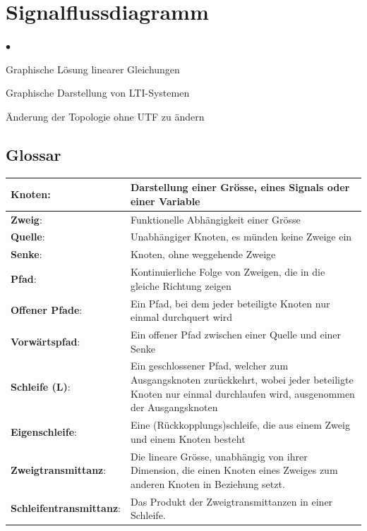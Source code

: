 \section{Signalflussdiagramm }
\begin{list}{$\bullet$}{\setlength{\itemsep}{0cm} \setlength{\parsep}{0cm} \setlength{\topsep}{0cm}} 
  \item Graphische Lösung linearer Gleichungen
  \item Graphische Darstellung von LTI-Systemen
  \item Änderung der Topologie ohne UTF zu ändern
\end{list}

\subsection{Glossar }
  \begin{tabular}{|m{4cm} | m{14cm}|}
    \hline
      \textbf{Knoten}: &
      Darstellung einer Grösse, eines Signals oder einer Variable \\
    \hline
      \textbf{Zweig}: &
      Funktionelle Abhängigkeit einer Grösse \\
    \hline
      \textbf{Quelle}: &
      Unabhängiger Knoten, es münden keine Zweige ein \\
    \hline
      \textbf{Senke}: &
      Knoten, ohne weggehende Zweige \\
    \hline
      \textbf{Pfad}: &
      Kontinuierliche Folge von Zweigen, die in die gleiche Richtung zeigen \\
    \hline
      \textbf{Offener Pfade}: &
      Ein Pfad, bei dem jeder beteiligte Knoten nur einmal durchquert wird \\
      \textbf{Vorwärtspfad}: &
      Ein offener Pfad zwischen einer Quelle und einer Senke \\
    \hline
      \textbf{Schleife (L)}: &
      Ein geschlossener Pfad, welcher zum Ausgangsknoten zurückkehrt, 
      wobei jeder beteiligte Knoten nur einmal durchlaufen wird, ausgenommen der
      Ausgangsknoten \\
    \hline
      \textbf{Eigenschleife}: &
      Eine (Rückkopplungs)schleife, die aus einem Zweig und einem Knoten besteht \\
    \hline
      \textbf{Zweigtransmittanz}: &
      Die lineare Grösse, unabhängig von ihrer Dimension, 
      die einen Knoten eines Zweiges zum anderen Knoten in Beziehung setzt. \\
    \hline
      \textbf{Schleifentransmittanz}: &
      Das Produkt der Zweigtransmittanzen in einer Schleife. \\
    \hline
  \end{tabular}

